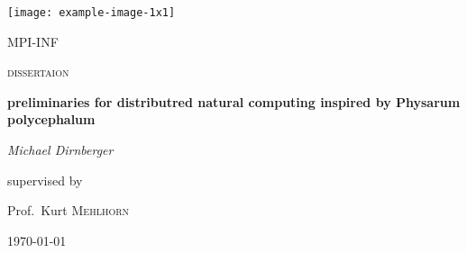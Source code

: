 
\begin{titlepage}
	\centering
	\texttt{[image: example-image-1x1]}\par\vspace{1cm}
	{\scshape\LARGE MPI-INF \par}
	\vspace{1cm}
	{\scshape\Large dissertaion\par}
	\vspace{1.5cm}
	{\huge\bfseries preliminaries for distributred natural computing inspired by Physarum polycephalum\par}
	\vspace{2cm}
	{\Large\itshape Michael Dirnberger\par}
	\vfill
	supervised by\par
	Prof.~Kurt \textsc{Mehlhorn}

	\vfill

	{\large \today\par}
\end{titlepage}